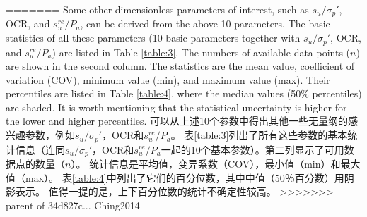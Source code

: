 \begin{paracol}{2}
=======
    \ParallelLText
    {
        Some other dimensionless parameters of interest, such as $s_u/\sigma_p'$, OCR, and $s_u^{re}/P_a$, can be derived from the above 10 parameters. The basic statistics of all these parameters (10 basic parameters together with $s_u/\sigma_p'$, OCR, and $s_u^{re}/P_a$) are listed in Table \ref{table:3}. The numbers of available data points ($n$) are shown in the second column. The statistics are the mean value, coefficient of variation (COV), minimum value (min), and maximum value (max). Their percentiles are listed in Table \ref{table:4}, where the median values (50$\%$ percentiles) are shaded. It is worth mentioning that the statistical uncertainty is higher for the lower and higher percentiles.
    }
    \ParallelRText
    {
        可以从上述10个参数中得出其他一些无量纲的感兴趣参数，例如$s_u/\sigma_p'$，OCR和$s_u^{re}/P_a$。 表\ref{table:3}列出了所有这些参数的基本统计信息（连同$s_u/\sigma_p'$，OCR和$s_u^{re}/P_a$一起的10个基本参数）。第二列显示了可用数据点的数量（$n$）。 统计信息是平均值，变异系数（COV），最小值（min）和最大值（max）。 表\ref{table:4}中列出了它们的百分位数，其中中值（50％百分数）用阴影表示。 值得一提的是，上下百分位数的统计不确定性较高。
    }
    \ParallelPar
>>>>>>> parent of 34d827c... Ching2014
    
\end{paracol}
